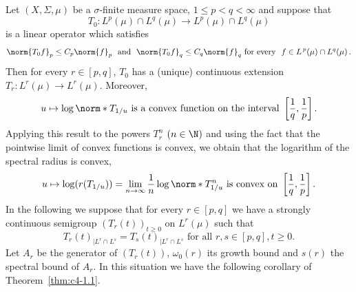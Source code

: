 Let $(X,\Sigma,\mu)$ be a $\sigma$-finite measure space, $1 \leq p < q < \infty$ and suppose that 
\[
T_{0} \colon L^{p}(\mu) \cap L^{q}(\mu) \to L^{p}(\mu) \cap L^{q}(\mu)
\]
is a linear operator which satisfies 
\[
\norm{T_{0}f}_{p} \leq C_{p}\norm{f}_{p} \ \text{ and } \ \norm{T_{0}f}_{q} \leq C_{q}\norm{f}_{q} 
\ \text{for every } \ f\in L^{\,p}(\mu) \cap L^{q}(\mu)\,.
\]
Then for every $r \in [p,q]$, $T_{0}$ has a (unique) continuous extension $T_{r} \colon L^{r}(\mu) \to L^{r}(\mu)$.
Moreover,
\begin{equation}\label{eq:c4-1.1}
u \mapsto \log\norm*{T_{1/u}} \text{ is a convex function on the interval } \left[\frac{1}{q},\frac{1}{p}\right].
\end{equation}
Applying this result to the powers $T_{r}^{n}$ $(n \in\N)$ and using the fact that the pointwise limit of convex functions is convex, we obtain that the logarithm of the spectral radius is convex, \ie
\begin{equation}\label{eq:c4-1.2}
u \mapsto \log(r(T_{1/u})) = \lim_{n\to\infty} \frac{1}{n}\log\norm*{T_{1/u}^{n}} \text{ is convex on }  \left[\frac{1}{q},\frac{1}{p}\right].
\end{equation}
In the following we suppose that for every $r \in [p,q]$ we have a strongly continuous semigroup $(T_{r}(t))_{t\geq 0}$ on $L^{r}(\mu)$ such that
\begin{equation}\label{eq:c4-1.3}
T_{r}(t)_{|L^{r} \cap L^{s}} = T_{s}(t)_{|L^{r} \cap L^{s}} \text{ for all } r,s \in [p,q], t \geq 0.
\end{equation}
Let $A_{r}$ be the generator of\/ $(T_{r}(t))$, $\omega_{0}(r)$ its growth bound and $s(r)$ the spectral bound of\/ $A_{r}$.
In this situation we have the following corollary of Theorem~\ref{thm:c4-1.1}.

